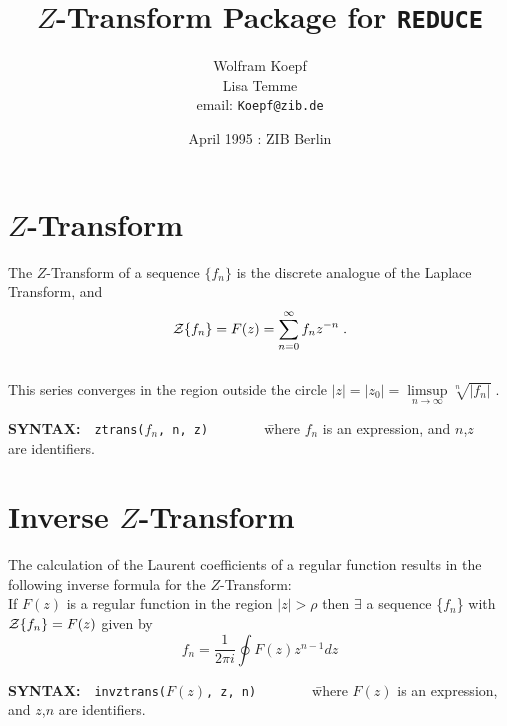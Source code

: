 \title{{\bf $Z$-Transform Package for {\tt REDUCE}}}
\author{Wolfram Koepf \\ Lisa Temme \\ email: {\tt Koepf@zib.de}}
\date{April 1995 : ZIB Berlin}

\maketitle
\section{$Z$-Transform}

  The $Z$-Transform of a sequence $\{f_n\}$ is the discrete analogue
  of the Laplace Transform, and
  \[{\cal Z}\{f_n\} = F(z) = \sum^\infty_{n=0} f_nz^{-n}\;.\] \\
  This series converges in the region outside the circle 
  $|z|=|z_0|= \limsup\limits_{n \rightarrow \infty} \sqrt[n]{|f_n|}\;.$


\begin{tabbing}

{\bf SYNTAX:}\ \ {\tt ztrans($f_n$, n,  z)}\ \ \ \ \ \ \ \
  \=where $f_n$ is an expression, and $n$,$z$ \\
  \> are identifiers.\\
\end{tabbing}


\section{Inverse $Z$-Transform}
  The calculation of the Laurent coefficients of a regular function
  results in the following inverse formula for the $Z$-Transform:
  \\
  If $F(z)$ is a regular function in the region $|z|> \rho$ then
  $\exists$ a sequence \{$f_n$\} with ${\cal Z} \{f_n\}=F(z)$
  given by
  \[f_n = \frac{1}{2 \pi i}\oint F(z) z^{n-1} dz\]


\begin{tabbing}

{\bf SYNTAX:}\ \ {\tt invztrans($F(z)$, z,  n)}\ \ \ \ \ \ \ \
  \=where $F(z)$ is an expression, \\
  \> and $z$,$n$ are identifiers.
\end{tabbing}


